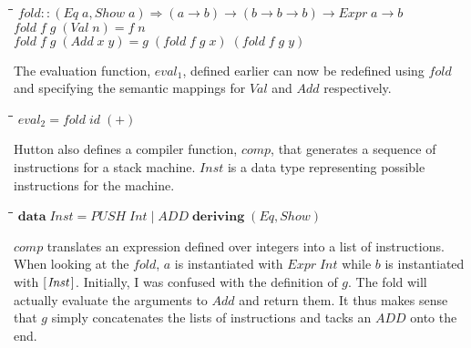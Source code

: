 \documentclass[10pt]{article}
\newlength{\lwidth}\setlength{\lwidth}{4.5cm}
\newlength{\cwidth}\setlength{\cwidth}{8mm} %
\newcommand{\Conid}[1]{\mathit{#1}}
\newcommand{\Varid}[1]{\mathit{#1}}
\begin{document}
\begin{tabbing}
\qquad\=\hspace{\lwidth}\=\hspace{\cwidth}\=\+\kill
${\Varid{fold}\mathbin{::}(\Conid{Eq}\;\Varid{a},\Conid{Show}\;\Varid{a})\Rightarrow (\Varid{a}\to \Varid{b})\to (\Varid{b}\to \Varid{b}\to \Varid{b})\to \Conid{Expr}\;\Varid{a}\to \Varid{b}}$\\
${\Varid{fold}\;\Varid{f}\;\Varid{g}\;(\Conid{Val}\;\Varid{n})\mathrel{=}\Varid{f}\;\Varid{n}}$\\
${\Varid{fold}\;\Varid{f}\;\Varid{g}\;(\Conid{Add}\;\Varid{x}\;\Varid{y})\mathrel{=}\Varid{g}\;(\Varid{fold}\;\Varid{f}\;\Varid{g}\;\Varid{x})\;(\Varid{fold}\;\Varid{f}\;\Varid{g}\;\Varid{y})}$
\end{tabbing}
The evaluation function, \ensuremath{\Varid{eval}_1}, defined earlier can now be redefined
using \ensuremath{\Varid{fold}} and specifying the semantic mappings for \ensuremath{\Conid{Val}} and \ensuremath{\Conid{Add}}
respectively.

\begin{tabbing}
\qquad\=\hspace{\lwidth}\=\hspace{\cwidth}\=\+\kill
${\Varid{eval}_2\mathrel{=}\Varid{fold}\;\Varid{id}\;(\mathbin{+})}$
\end{tabbing}
Hutton also defines a compiler function, \ensuremath{\Varid{comp}}, that generates a
sequence of instructions for a stack machine.  \ensuremath{\Conid{Inst}} is a data type
representing possible instructions for the machine.  

\begin{tabbing}
\qquad\=\hspace{\lwidth}\=\hspace{\cwidth}\=\+\kill
${\mathbf{data}\;\Conid{Inst}\mathrel{=}\Conid{PUSH}\;\Conid{Int}\mid \Conid{ADD}\;\mathbf{deriving}\;(\Conid{Eq},\Conid{Show})}$
\end{tabbing}
\ensuremath{\Varid{comp}} translates an expression defined over integers into a list of
instructions.  When looking at the \ensuremath{\Varid{fold}}, \ensuremath{\Varid{a}} is instantiated with
\ensuremath{\Conid{Expr}\;\Conid{Int}} while \ensuremath{\Varid{b}} is instantiated with \ensuremath{[\mskip1.5mu \Conid{Inst}\mskip1.5mu]}.  Initially, I was
confused with the definition of \ensuremath{\Varid{g}}.  The fold will actually evaluate
the arguments to \ensuremath{\Conid{Add}} and return them.  It thus makes sense that \ensuremath{\Varid{g}}
simply concatenates the lists of instructions and tacks an \ensuremath{\Conid{ADD}} onto
the end.
\end{document}
